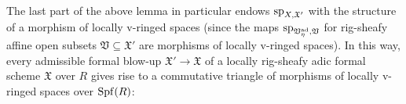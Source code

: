 \documentclass[12pt,twoside,a4paper]{article}
\theoremstyle{definition}
\theoremstyle{remark}
\newcommand\ad{{\rm ad}}
\newcommand\spc{{\rm sp}}
\newcommand\Spf{{\rm Spf}}
\begin{document}
The last part of the above lemma in particular endows $\spc_{X,\mathfrak{X}'}$ with the structure of a morphism of locally v-ringed spaces (since the maps $\spc_{\mathfrak{V}_{\eta}^{\ad},\mathfrak{V}}$ for rig-sheafy affine open subsets $\mathfrak{V}\subseteq \mathfrak{X}'$ are morphisms of locally v-ringed spaces). In this way, every admissible formal blow-up $\mathfrak{X}'\to\mathfrak{X}$ of a locally rig-sheafy adic formal scheme $\mathfrak{X}$ over $R$ gives rise to a commutative triangle of morphisms of locally v-ringed spaces over $\Spf(R)$: \begin{center}\end{center}
\end{document}
